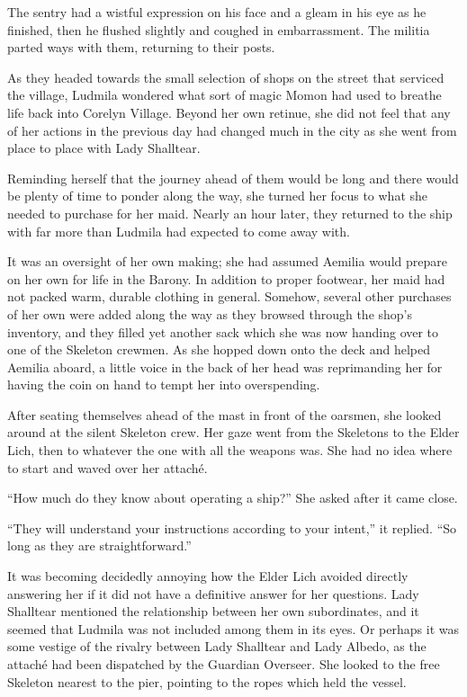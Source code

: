  

The sentry had a wistful expression on his face and a gleam in his eye as he finished, then he flushed slightly and coughed in embarrassment. The militia parted ways with them, returning to their posts.

 

As they headed towards the small selection of shops on the street that serviced the village, Ludmila wondered what sort of magic Momon had used to breathe life back into Corelyn Village. Beyond her own retinue, she did not feel that any of her actions in the previous day had changed much in the city as she went from place to place with Lady Shalltear.

 

Reminding herself that the journey ahead of them would be long and there would be plenty of time to ponder along the way, she turned her focus to what she needed to purchase for her maid. Nearly an hour later, they returned to the ship with far more than Ludmila had expected to come away with.

 

It was an oversight of her own making; she had assumed Aemilia would prepare on her own for life in the Barony. In addition to proper footwear, her maid had not packed warm, durable clothing in general. Somehow, several other purchases of her own were added along the way as they browsed through the shop’s inventory, and they filled yet another sack which she was now handing over to one of the Skeleton crewmen. As she hopped down onto the deck and helped Aemilia aboard, a little voice in the back of her head was reprimanding her for having the coin on hand to tempt her into overspending.

 

After seating themselves ahead of the mast in front of the oarsmen, she looked around at the silent Skeleton crew. Her gaze went from the Skeletons to the Elder Lich, then to whatever the one with all the weapons was. She had no idea where to start and waved over her attaché.

 

“How much do they know about operating a ship?” She asked after it came close.

 

“They will understand your instructions according to your intent,” it replied. “So long as they are straightforward.”

 

It was becoming decidedly annoying how the Elder Lich avoided directly answering her if it did not have a definitive answer for her questions. Lady Shalltear mentioned the relationship between her own subordinates, and it seemed that Ludmila was not included among them in its eyes. Or perhaps it was some vestige of the rivalry between Lady Shalltear and Lady Albedo, as the attaché had been dispatched by the Guardian Overseer. She looked to the free Skeleton nearest to the pier, pointing to the ropes which held the vessel.

